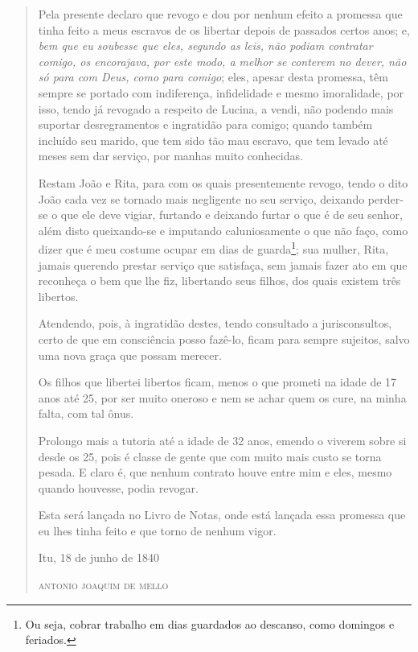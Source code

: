 \begin{quote}
Pela presente declaro que revogo e dou por nenhum efeito a promessa que
tinha feito a meus escravos de os libertar depois de passados certos
anos; e, \emph{bem que eu soubesse que eles, segundo as leis, não podiam
contratar comigo, os encorajava, por este modo, a melhor se conterem no
dever, não só para com Deus, como para comigo}; eles, apesar desta
promessa, têm sempre se portado com indiferença, infidelidade e mesmo
imoralidade, por isso, tendo já revogado a respeito de Lucina, a vendi,
não podendo mais suportar desregramentos e ingratidão para comigo;
quando também incluído seu marido, que tem sido tão mau escravo, que tem
levado até meses sem dar serviço, por manhas muito conhecidas.

Restam João e Rita, para com os quais presentemente revogo, tendo o dito
João cada vez se tornado mais negligente no seu serviço, deixando
perder-se o que ele deve vigiar, furtando e deixando furtar o que é de
seu senhor, além disto queixando-se e imputando caluniosamente o que não
faço, como dizer que é meu costume ocupar em dias de guarda\footnote{
  Ou seja, cobrar trabalho em dias guardados ao descanso, como domingos
  e feriados.}; sua mulher, Rita, jamais querendo prestar serviço que
satisfaça, sem jamais fazer ato em que reconheça o bem que lhe fiz,
libertando seus filhos, dos quais existem três libertos.

Atendendo, pois, à ingratidão destes, tendo consultado a jurisconsultos,
certo de que em consciência posso fazê-lo, ficam para sempre sujeitos,
salvo uma nova graça que possam merecer.

Os filhos que libertei libertos ficam, menos o que prometi na idade de
17 anos até 25, por ser muito oneroso e nem se achar quem os cure, na
minha falta, com tal ônus.

Prolongo mais a tutoria até a idade de 32 anos, emendo o viverem sobre
si desde os 25, pois é classe de gente que com muito mais custo se torna
pesada. E claro é, que nenhum contrato houve entre mim e eles, mesmo
quando houvesse, podia revogar.

Esta será lançada no Livro de Notas, onde está lançada essa promessa que
eu lhes tinha feito e que torno de nenhum vigor.

\begin{flushright}
Itu, 18 de junho de 1840

\textsc{antonio joaquim de mello}
\end{flushright}
\end{quote}

